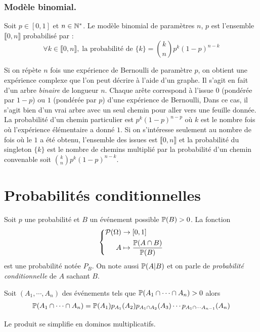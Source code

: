 \subsubsection{Modèle binomial.}
\begin{defi}
  Soit $p\in [0,1]$ et $n\in \mathbb{N}^*$. Le modèle binomial de paramètres $n$, $p$ est l'ensemble $\llbracket 0 , n \rrbracket$ probabilisé par :
  \begin{displaymath}
    \forall k \in \llbracket 0 , n \rrbracket, \; \text{la probabilité de } \{k\} = \binom{k}{n}p^k(1-p)^{n-k}
  \end{displaymath}
\end{defi}
Si on répète $n$ fois une expérience de Bernoulli de paramètre $p$, on obtient une expérience complexe que l'on peut décrire à l'aide d'un graphe. Il s'agit en fait d'un arbre \emph{binaire} de longueur $n$. Chaque arête correspond à l'issue $0$ (pondérée par $1-p$) ou $1$ (pondérée par $p$) d'une expérience de Bernoulli, Dans ce cas, il s'agit bien d'un vrai arbre avec un seul chemin pour aller vers une feuille donnée.\newline
La probabilité d'un chemin particulier est $p^k(1-p)^{n-p}$ où $k$ est le nombre fois où l'expérience élémentaire a donné $1$. Si on s'intéresse seulement au nombre de fois où le $1$ a été obtenu, l'ensemble des issues est $\llbracket 0, n \rrbracket$ et la probabilité du singleton $\{k\}$ est le nombre de chemins multiplié par la probabilité d'un chemin convenable soit $\binom{k}{n}p^k(1-p)^{n-k}$.
\clearpage

\section{Probabilités conditionnelles}
Soit $p$ une probabilité et $B$ un événement possible $\mathbb{P}(B)>0$. La fonction
\begin{displaymath}
 \left\lbrace 
\begin{aligned}
 \mathcal{P}(\Omega) &\rightarrow [0,1] \\
 A &\mapsto \frac{\mathbb{P}(A\cap B)}{\mathbb{P}(B)}
\end{aligned}
\right. 
\end{displaymath}
est une probabilité notée $P_B$. On note aussi $\mathbb{P}(A|B)$ et on parle de \emph{probabilité conditionnelle} de $A$ sachant $B$.

\begin{prop}
 Soit $(A_1,\cdots,A_n)$ des événements tels que $\mathbb{P}(A_1\cap \cdots \cap A_n)>0$ alors
\begin{displaymath}
 \mathbb{P}(A_1\cap \cdots \cap A_n) = \mathbb{P}(A_1)p_{A_1}(A_2)p_{A_1\cap A_2}(A_3) \cdots p_{A_1\cap \cdots A_{n-1}}(A_n)
\end{displaymath}
\end{prop}
\begin{demo}
  Le produit se simplifie en dominos multiplicatifs.
\end{demo}
\newpage

